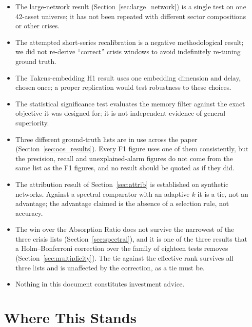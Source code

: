 \documentclass[11pt,a4paper]{article}
\begin{document}
\begin{itemize}
\item The large-network result (Section~\ref{sec:large_network}) is a single test on one 42-asset
  universe; it has not been repeated with different sector compositions or
  other crises.
\item The attempted short-series recalibration is a negative methodological
  result; we did not re-derive ``correct'' crisis windows to avoid
  indefinitely re-tuning ground truth.
\item The Takens-embedding H1 result uses one embedding dimension and delay,
  chosen once; a proper replication would test robustness to these choices.
\item The statistical significance test evaluates the memory filter against
  the exact objective it was designed for; it is not independent evidence of
  general superiority.
\item Three different ground-truth lists are in use across the paper
  (Section~\ref{sec:oos_results}). Every F1 figure uses one of them
  consistently, but the precision, recall and unexplained-alarm figures do not
  come from the same list as the F1 figures, and no result should be quoted as
  if they did.
\item The attribution result of Section~\ref{sec:attrib} is established on
  synthetic networks. Against a spectral comparator with an adaptive $k$ it is
  a tie, not an advantage; the advantage claimed is the absence of a selection
  rule, not accuracy.
\item The win over the Absorption Ratio does not survive the narrowest of the
  three crisis lists (Section~\ref{sec:spectral}), and it is one of the three
  results that a Holm--Bonferroni correction over the family of eighteen tests
  removes (Section~\ref{sec:multiplicity}). The tie against the effective rank
  survives all three lists and is unaffected by the correction, as a tie must
  be.
\item Nothing in this document constitutes investment advice.
\end{itemize}


\section{Where This Stands}
\end{document}
